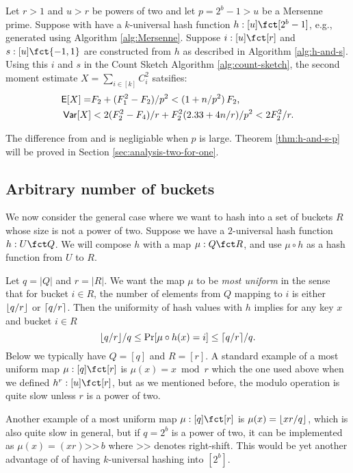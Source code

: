 \begin{theorem}\label{thm:h-and-s-p}
Let $r>1$ and $u>r$ be powers of two and let $p=2^b-1>u$ be a
Mersenne prime.
Suppose with have a $k$-universal hash function $h:[u]\fct[2^b-1]$, e.g.,
generated using Algorithm \ref{alg:Mersenne}. Suppose
$i:[u]\fct[r]$ and
$s:[u]\fct\{-1,1\}$ are constructed from $h$ as described in
Algorithm \ref{alg:h-and-s}. Using this $i$ and $s$ 
in the Count Sketch Algorithm \ref{alg:count-sketch}, the second moment 
estimate $X=\sum_{i\in[k]} C_i^2$ satsifies:
\begin{align}
\operatorname*{\sf{E}}[X]=&F_2+(F_1^2-F_2)/p^2 < (1+n/p^2)\,F_2\textnormal,\label{eq:E-F2-p}\\
{\sf Var}[X]&< 2(F_2^2-F_4)/r+F_2^2 (2.33+4 n/r)/p^2<2F_2^2/r.\label{eq:V-F2-p}
\end{align}
\end{theorem}
The difference from  and  
is negligiable when $p$ is large. Theorem \ref{thm:h-and-s-p} will be
proved in Section \ref{sec:analysis-two-for-one}.


\subsection{Arbitrary number of buckets}\label{sec:most-uniform}
We now consider the general case where we want to hash into a set of
buckets $R$ whose size is not a power of two. Suppose we have a
$2$-universal hash function $h:U\fct Q$. We will compose $h$ with a
map $\mu:Q\fct R$, and use $\mu\circ h$ as a hash function from
$U$ to $R$.

Let $q=|Q|$ and $r=|R|$. We want the map $\mu$ to be \emph{most
  uniform} in the sense that for bucket $i\in R$, the number of
elements from $Q$ mapping to $i$ is either $\lfloor {q/r} \rfloor$ or
$\lceil {q/r}\rceil$. Then the uniformity of hash values with $h$ implies for
any key $x$ and bucket $i\in R$
\[\lfloor {q/r} \rfloor/q\leq \Pr[\mu\circ
  h(x)=i]\leq \lceil {q/r}\rceil/q.\]
Below we typically have $Q=[q]$ and $R=[r]$. A standard example of a most uniform map $\mu:[q]\fct[r]$ 
is $\mu(x)=x\bmod r$ which the one used above when we defined 
$h^r:[u]\fct[r]$, but as we mentioned before, the modulo operation is 
quite slow unless $r$ is a power of two.

Another example of a most uniform map $\mu:[q]\fct[r]$ 
is $\mu(x)=\lfloor {xr/q} \rfloor$,
which is also quite slow in general, but if $q=2^b$ is a power of two,
it can be implemented as $\mu(x)=(xr)\texttt{>>}\,b$ where 
$\texttt{>>}$ denotes right-shift. This would be yet another advantage 
of of having $k$-universal hashing into $[2^b]$.

